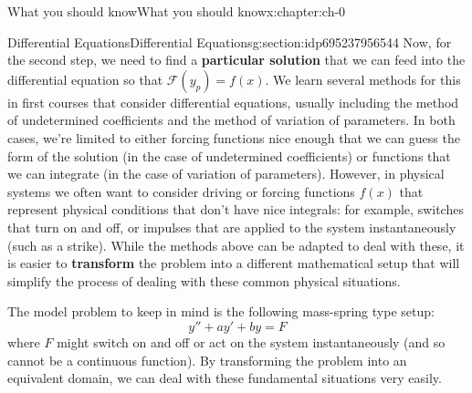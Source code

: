 \documentclass[oneside,10pt,]{book}
\newcommand{\terminology}[1]{\textbf{#1}}
\numberwithin{equation}{section}
\numberwithin{equation}{section}
\begin{document}
\begin{chapterptx}{What you should know}{}{What you should know}{}{}{x:chapter:ch-0}
\begin{sectionptx}{Differential Equations}{}{Differential Equations}{}{}{g:section:idp695237956544}
Now, for the second step, we need to find a \terminology{particular solution} that we can feed into the differential equation so that \(\mathcal{F}(y_p) = f(x)\). We learn several methods for this in first courses that consider differential equations, usually including the method of undetermined coefficients and the method of variation of parameters. In both cases, we're limited to either forcing functions nice enough that we can guess the form of the solution (in the case of undetermined coefficients) or functions that we can integrate (in the case of variation of parameters). However, in physical systems we often want to consider driving or forcing functions \(f(x)\) that represent physical conditions that don't have nice integrals: for example, switches that turn on and off, or impulses that are applied to the system instantaneously (such as a strike). While the methods above can be adapted to deal with these, it is easier to \terminology{transform} the problem into a different mathematical setup that will simplify the process of dealing with these common physical situations.%
\par
The model problem to keep in mind is the following mass-spring type setup:%
\begin{equation*}
y'' + ay ' + by = F
\end{equation*}
where \(F\) might switch on and off or act on the system instantaneously (and so cannot be a continuous function). By transforming the problem into an equivalent domain, we can deal with these fundamental situations very easily.%
\end{sectionptx}
\end{chapterptx}
%
%
\typeout{************************************************}
\typeout{************************************************}
%
\end{document}

